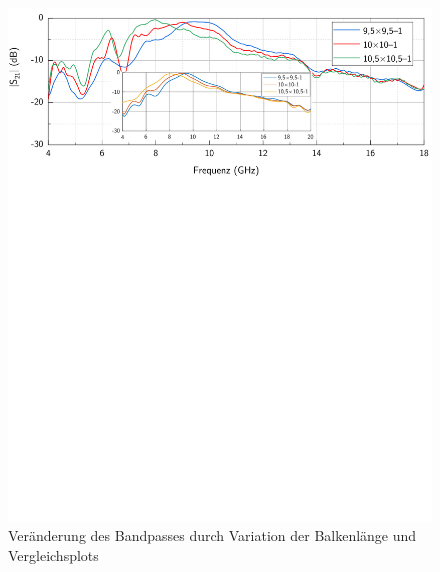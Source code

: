 \begin{figure}[H]
    \centering
        \includegraphics[page=1, width=.99\textwidth, trim = 0cm 13.3cm 0cm 0cm, clip]{Abbildungen/Kapitel4/Messergebnisse/Vergleich_Balkenlaenge.pdf}
    \caption[Veränderung des Bandpasses durch Variation der Balkenlänge]{Veränderung des Bandpasses durch Variation der Balkenlänge und Vergleichsplots~\cite{FSS_Toedter_Diplomarbeit}}\label{fig:4_Variation_Balkenlaenge}
\end{figure}

